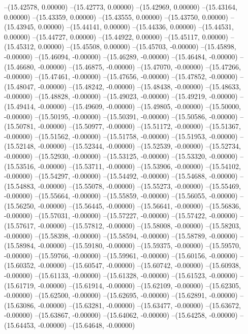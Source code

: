 --(15.42578, 0.00000)
--(15.42773, 0.00000)
--(15.42969, 0.00000)
--(15.43164, 0.00000)
--(15.43359, 0.00000)
--(15.43555, 0.00000)
--(15.43750, 0.00000)
--(15.43945, 0.00000)
--(15.44141, 0.00000)
--(15.44336, 0.00000)
--(15.44531, 0.00000)
--(15.44727, 0.00000)
--(15.44922, 0.00000)
--(15.45117, 0.00000)
--(15.45312, 0.00000)
--(15.45508, 0.00000)
--(15.45703, -0.00000)
--(15.45898, -0.00000)
--(15.46094, -0.00000)
--(15.46289, -0.00000)
--(15.46484, -0.00000)
--(15.46680, -0.00000)
--(15.46875, -0.00000)
--(15.47070, -0.00000)
--(15.47266, -0.00000)
--(15.47461, -0.00000)
--(15.47656, -0.00000)
--(15.47852, -0.00000)
--(15.48047, -0.00000)
--(15.48242, -0.00000)
--(15.48438, -0.00000)
--(15.48633, -0.00000)
--(15.48828, -0.00000)
--(15.49023, -0.00000)
--(15.49219, -0.00000)
--(15.49414, -0.00000)
--(15.49609, -0.00000)
--(15.49805, -0.00000)
--(15.50000, -0.00000)
--(15.50195, -0.00000)
--(15.50391, -0.00000)
--(15.50586, -0.00000)
--(15.50781, -0.00000)
--(15.50977, -0.00000)
--(15.51172, -0.00000)
--(15.51367, -0.00000)
--(15.51562, -0.00000)
--(15.51758, -0.00000)
--(15.51953, -0.00000)
--(15.52148, -0.00000)
--(15.52344, -0.00000)
--(15.52539, -0.00000)
--(15.52734, -0.00000)
--(15.52930, -0.00000)
--(15.53125, -0.00000)
--(15.53320, -0.00000)
--(15.53516, -0.00000)
--(15.53711, -0.00000)
--(15.53906, -0.00000)
--(15.54102, -0.00000)
--(15.54297, -0.00000)
--(15.54492, -0.00000)
--(15.54688, -0.00000)
--(15.54883, -0.00000)
--(15.55078, -0.00000)
--(15.55273, -0.00000)
--(15.55469, -0.00000)
--(15.55664, -0.00000)
--(15.55859, -0.00000)
--(15.56055, -0.00000)
--(15.56250, -0.00000)
--(15.56445, -0.00000)
--(15.56641, -0.00000)
--(15.56836, -0.00000)
--(15.57031, -0.00000)
--(15.57227, -0.00000)
--(15.57422, -0.00000)
--(15.57617, -0.00000)
--(15.57812, -0.00000)
--(15.58008, -0.00000)
--(15.58203, -0.00000)
--(15.58398, -0.00000)
--(15.58594, -0.00000)
--(15.58789, -0.00000)
--(15.58984, -0.00000)
--(15.59180, -0.00000)
--(15.59375, -0.00000)
--(15.59570, -0.00000)
--(15.59766, -0.00000)
--(15.59961, -0.00000)
--(15.60156, -0.00000)
--(15.60352, -0.00000)
--(15.60547, -0.00000)
--(15.60742, -0.00000)
--(15.60938, -0.00000)
--(15.61133, -0.00000)
--(15.61328, -0.00000)
--(15.61523, -0.00000)
--(15.61719, -0.00000)
--(15.61914, -0.00000)
--(15.62109, -0.00000)
--(15.62305, -0.00000)
--(15.62500, -0.00000)
--(15.62695, -0.00000)
--(15.62891, -0.00000)
--(15.63086, -0.00000)
--(15.63281, -0.00000)
--(15.63477, -0.00000)
--(15.63672, -0.00000)
--(15.63867, -0.00000)
--(15.64062, -0.00000)
--(15.64258, -0.00000)
--(15.64453, -0.00000)
--(15.64648, -0.00000)
